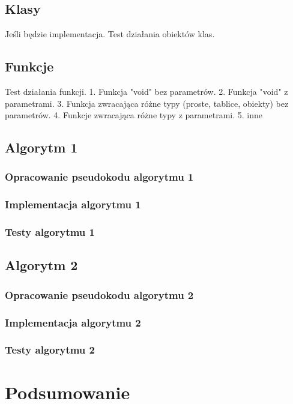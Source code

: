 \documentclass[a4paper]{article}
\begin{document}
\subsection{Klasy}
Jeśli będzie implementacja.
Test działania obiektów klas.
\subsection{Funkcje}
Test działania funkcji.
1. Funkcja "void" bez parametrów.
2. Funkcja "void" z parametrami.
3. Funkcja zwracająca różne typy (proste, tablice, obiekty) bez parametrów.
4. Funkcje zwracająca różne typy z parametrami.
5. inne

\subsection{Algorytm 1}
\subsubsection{Opracowanie pseudokodu algorytmu 1}
\subsubsection{Implementacja algorytmu 1}
\subsubsection{Testy algorytmu 1}
\subsection{Algorytm 2}
\subsubsection{Opracowanie pseudokodu algorytmu 2}
\subsubsection{Implementacja algorytmu 2}
\subsubsection{Testy algorytmu 2}


\section{Podsumowanie}
\end{document}
